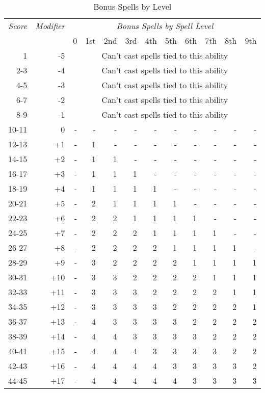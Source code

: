 \begin{wraptable}{o}{5in}
\caption{Bonus Spells by Level}
\begin{tabular}[h!]{rr|rrrrrrrrrr}
 \multicolumn{ 1}{c}{{\it Score}} & \multicolumn{ 1}{c|}{{\it Modifier}} & \multicolumn{ 10}{|c}{{\it Bonus Spells by Spell Level}}\\
 \multicolumn{ 1}{r}{} & \multicolumn{ 1}{r|}{} & 0 & 1st & 2nd & 3rd & 4th & 5th & 6th & 7th & 8th & 9th \\
 1     & -5  & \multicolumn{10}{|c}{Can't cast spells tied to this ability} \\
 2-3   & -4  & \multicolumn{10}{|c}{Can't cast spells tied to this ability} \\
 4-5   & -3  & \multicolumn{10}{|c}{Can't cast spells tied to this ability} \\
 6-7   & -2  & \multicolumn{10}{|c}{Can't cast spells tied to this ability} \\
 8-9   & -1  & \multicolumn{10}{|c}{Can't cast spells tied to this ability} \\
 10-11 &  0  & - & - & - & - & - & - & - & - & - & - \\
 12-13 & +1  & - & 1 & - & - & - & - & - & - & - & - \\
 14-15 & +2  & - & 1 & 1 & - & - & - & - & - & - & - \\
 16-17 & +3  & - & 1 & 1 & 1 & - & - & - & - & - & - \\
 18-19 & +4  & - & 1 & 1 & 1 & 1 & - & - & - & - & - \\
 20-21 & +5  & - & 2 & 1 & 1 & 1 & 1 & - & - & - & - \\
 22-23 & +6  & - & 2 & 2 & 1 & 1 & 1 & 1 & - & - & - \\
 24-25 & +7  & - & 2 & 2 & 2 & 1 & 1 & 1 & 1 & - & - \\
 26-27 & +8  & - & 2 & 2 & 2 & 2 & 1 & 1 & 1 & 1 & - \\
 28-29 & +9  & - & 3 & 2 & 2 & 2 & 2 & 1 & 1 & 1 & 1 \\
 30-31 & +10 & - & 3 & 3 & 2 & 2 & 2 & 2 & 1 & 1 & 1 \\
 32-33 & +11 & - & 3 & 3 & 3 & 2 & 2 & 2 & 2 & 1 & 1 \\
 34-35 & +12 & - & 3 & 3 & 3 & 3 & 2 & 2 & 2 & 2 & 1 \\
 36-37 & +13 & - & 4 & 3 & 3 & 3 & 3 & 2 & 2 & 2 & 2 \\
 38-39 & +14 & - & 4 & 4 & 3 & 3 & 3 & 3 & 2 & 2 & 2 \\
 40-41 & +15 & - & 4 & 4 & 4 & 3 & 3 & 3 & 3 & 2 & 2 \\
 42-43 & +16 & - & 4 & 4 & 4 & 4 & 3 & 3 & 3 & 3 & 2 \\
 44-45 & +17 & - & 4 & 4 & 4 & 4 & 4 & 3 & 3 & 3 & 3 \\
\end{tabular}  
\end{wraptable}

